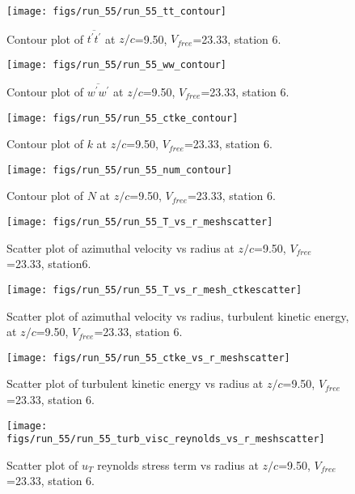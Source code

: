 \begin{figure}[H]
\centering
\texttt{[image: figs/run\_55/run\_55\_tt\_contour]}
\caption{Contour plot of $\overline{t^\prime t^\prime}$ at $z/c$=9.50, $V_{free}$=23.33, station 6.}
\end{figure}


\begin{figure}[H]
\centering
\texttt{[image: figs/run\_55/run\_55\_ww\_contour]}
\caption{Contour plot of $\overline{w^\prime w^\prime}$ at $z/c$=9.50, $V_{free}$=23.33, station 6.}
\end{figure}


\begin{figure}[H]
\centering
\texttt{[image: figs/run\_55/run\_55\_ctke\_contour]}
\caption{Contour plot of $k$ at $z/c$=9.50, $V_{free}$=23.33, station 6.}
\end{figure}


\begin{figure}[H]
\centering
\texttt{[image: figs/run\_55/run\_55\_num\_contour]}
\caption{Contour plot of $N$ at $z/c$=9.50, $V_{free}$=23.33, station 6.}
\end{figure}


\begin{figure}[H]
\centering
\texttt{[image: figs/run\_55/run\_55\_T\_vs\_r\_meshscatter]}
\caption{Scatter plot of azimuthal velocity vs radius at $z/c$=9.50, $V_{free}$=23.33, station6.}
\end{figure}


\begin{figure}[H]
\centering
\texttt{[image: figs/run\_55/run\_55\_T\_vs\_r\_mesh\_ctkescatter]}
\caption{Scatter plot of azimuthal velocity vs radius, turbulent kinetic energy, at $z/c$=9.50, $V_{free}$=23.33, station 6.}
\end{figure}


\begin{figure}[H]
\centering
\texttt{[image: figs/run\_55/run\_55\_ctke\_vs\_r\_meshscatter]}
\caption{Scatter plot of turbulent kinetic energy vs radius at $z/c$=9.50, $V_{free}$=23.33, station 6.}
\end{figure}


\begin{figure}[H]
\centering
\texttt{[image: figs/run\_55/run\_55\_turb\_visc\_reynolds\_vs\_r\_meshscatter]}
\caption{Scatter plot of $
u_T$ reynolds stress term vs radius at $z/c$=9.50, $V_{free}$=23.33, station 6.}
\end{figure}


